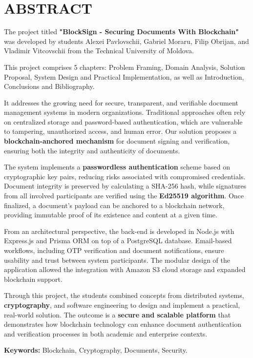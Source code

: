 \chapter*{ABSTRACT}
\thispagestyle{empty}

The project titled \textbf{"BlockSign - Securing Documents With Blockchain"} was developed by students Alexei Pavlovschii, Gabriel Moraru, Filip Obrijan, and Vladimir Vitcovschii from the Technical University of Moldova.

This project comprises 5 chapters: Problem Framing, Domain Analysis, Solution Proposal, System Design and Practical Implementation, as well as Introduction, Conclusions and Bibliography.

It addresses the growing need for secure, transparent, and verifiable document management systems in modern organizations. Traditional approaches often rely on centralized storage and password-based authentication, which are vulnerable to tampering, unauthorized access, and human error. Our solution proposes a \textbf{blockchain-anchored mechanism} for document signing and verification, ensuring both the integrity and authenticity of documents.

The system implements a \textbf{passwordless authentication} scheme based on cryptographic key pairs, reducing risks associated with compromised credentials. Document integrity is preserved by calculating a SHA-256 hash, while signatures from all involved participants are verified using the \textbf{Ed25519 algorithm}. Once finalized, a document’s payload can be anchored to a blockchain network, providing immutable proof of its existence and content at a given time.

From an architectural perspective, the back-end is developed in Node.js with Express.js and Prisma ORM on top of a PostgreSQL database. Email-based workflows, including OTP verification and document notifications, ensure usability and trust between system participants. The modular design of the application allowed the integration with Amazon S3 cloud storage and expanded blockchain support.

Through this project, the students combined concepts from distributed systems, \textbf{cryptography}, and software engineering to design and implement a practical, real-world solution. The outcome is a \textbf{secure and scalable platform} that demonstrates how blockchain technology can enhance document authentication and verification processes in both academic and enterprise contexts.

\textbf{Keywords: } Blockchain, Cryptography, Documents, Security.
